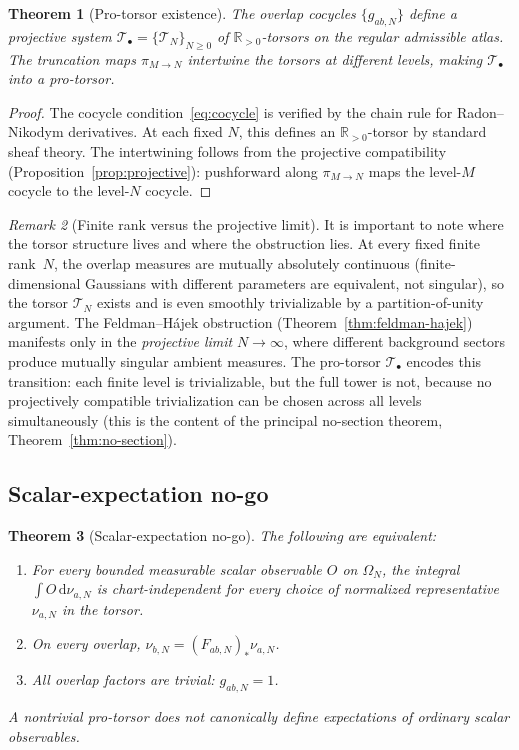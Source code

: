 \documentclass[12pt,a4paper]{article}
\theoremstyle{plain}
\newtheorem{theorem}{Theorem}[section]
\theoremstyle{definition}
\theoremstyle{remark}
\newtheorem{remark}[theorem]{Remark}
\newcommand{\dd}{\mathrm{d}}
\newcommand{\R}{\mathbb{R}}
\begin{document}
\begin{theorem}[Pro-torsor existence]
\label{thm:pro-torsor}
The overlap cocycles $\{g_{ab,N}\}$ define a projective system
$\mathcal{T}_\bullet = \{\mathcal{T}_N\}_{N \ge 0}$ of
$\R_{>0}$-torsors on the regular admissible atlas.  The truncation
maps $\pi_{M \to N}$ intertwine the torsors at different levels,
making $\mathcal{T}_\bullet$ into a pro-torsor.
\end{theorem}

\begin{proof}
The cocycle condition~\eqref{eq:cocycle} is verified by the chain rule
for Radon--Nikodym derivatives.  At each fixed $N$, this defines an
$\R_{>0}$-torsor by standard sheaf theory.  The intertwining follows
from the projective compatibility
(Proposition~\ref{prop:projective}): pushforward along $\pi_{M \to N}$
maps the level-$M$ cocycle to the level-$N$ cocycle.
\end{proof}

\begin{remark}[Finite rank versus the projective limit]
\label{rem:finite-vs-limit}
It is important to note where the torsor structure lives and where
the obstruction lies.  At every fixed finite rank~$N$, the overlap
measures are mutually absolutely continuous (finite-dimensional
Gaussians with different parameters are equivalent, not singular),
so the torsor $\mathcal{T}_N$ exists and is even smoothly
trivializable by a partition-of-unity argument.  The
Feldman--H\'ajek obstruction (Theorem~\ref{thm:feldman-hajek})
manifests only in the \emph{projective limit} $N \to \infty$, where
different background sectors produce mutually singular ambient
measures.  The pro-torsor $\mathcal{T}_\bullet$ encodes this
transition: each finite level is trivializable, but the full tower
is not, because no projectively compatible trivialization
can be chosen across all levels simultaneously (this is the content
of the principal no-section theorem, Theorem~\ref{thm:no-section}).
\end{remark}

\subsection{Scalar-expectation no-go}

\begin{theorem}[Scalar-expectation no-go]
\label{thm:scalar-nogo}
The following are equivalent:
\begin{enumerate}[label=\textup{(\roman*)},leftmargin=2.5em]
  \item For every bounded measurable scalar observable $O$ on
    $\Omega_N$, the integral $\int O\,\dd\nu_{a,N}$ is chart-independent
    for every choice of normalized representative $\nu_{a,N}$ in the
    torsor.
  \item On every overlap, $\nu_{b,N} = (F_{ab,N})_*\nu_{a,N}$.
  \item All overlap factors are trivial: $g_{ab,N} = 1$.
\end{enumerate}
A nontrivial pro-torsor does not canonically define expectations of
ordinary scalar observables.
\end{theorem}
\end{document}
